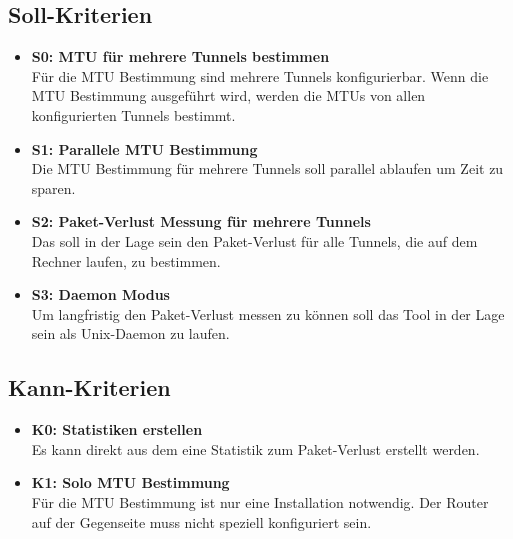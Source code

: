 \subsection{Soll-Kriterien}
\begin{itemize}

\item \textbf{S0: MTU für mehrere Tunnels bestimmen} \\
Für die \ac{MTU} Bestimmung sind mehrere Tunnels konfigurierbar. Wenn die \ac{MTU} Bestimmung ausgeführt wird, werden die \ac{MTU}s von allen konfigurierten Tunnels bestimmt.

\item \textbf{S1: Parallele MTU Bestimmung} \\
Die \ac{MTU} Bestimmung für mehrere Tunnels soll parallel ablaufen um Zeit zu sparen.

\item \textbf{S2: Paket-Verlust Messung für mehrere Tunnels} \\
Das \tool{} soll in der Lage sein den Paket-Verlust für alle Tunnels, die auf dem Rechner laufen, zu bestimmen.
  	
\item \textbf{S3: Daemon Modus} \\
Um langfristig den Paket-Verlust messen zu können soll das Tool in der Lage sein als Unix-Daemon zu laufen.

\end{itemize}

\subsection{Kann-Kriterien}
\begin{itemize}

\item \textbf{K0: Statistiken erstellen} \\
Es kann direkt aus dem \tool{} eine Statistik zum Paket-Verlust erstellt werden.

\item \textbf{K1: Solo \ac{MTU} Bestimmung} \\
Für die \ac{MTU} Bestimmung ist nur eine \tool{} Installation notwendig. Der Router auf der Gegenseite muss nicht speziell konfiguriert sein.

\end{itemize}